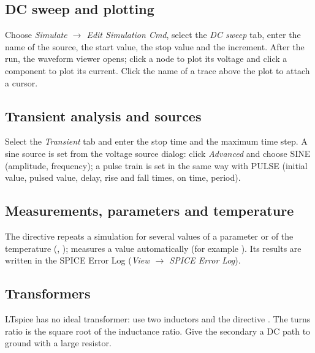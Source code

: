 
\subsection{DC sweep and plotting}
Choose \textit{Simulate $\rightarrow$ Edit Simulation Cmd}, select the \textit{DC sweep} tab, enter the name of the source, the start value, the stop value and the increment. After the run, the waveform viewer opens; click a node to plot its voltage and click a component to plot its current. Click the name of a trace above the plot to attach a cursor.


\subsection{Transient analysis and sources}
Select the \textit{Transient} tab and enter the stop time and the maximum time step. A sine source is set from the voltage source dialog: click \textit{Advanced} and choose SINE (amplitude, frequency); a pulse train is set in the same way with PULSE (initial value, pulsed value, delay, rise and fall times, on time, period).


\subsection{Measurements, parameters and temperature}
The directive  repeats a simulation for several values of a parameter or of the temperature (, );  measures a value automatically (for example ). Its results are written in the SPICE Error Log (\textit{View $\rightarrow$ SPICE Error Log}).

\subsection{Transformers}
LTspice has no ideal transformer: use two inductors and the directive . The turns ratio is the square root of the inductance ratio. Give the secondary a DC path to ground with a large resistor.



